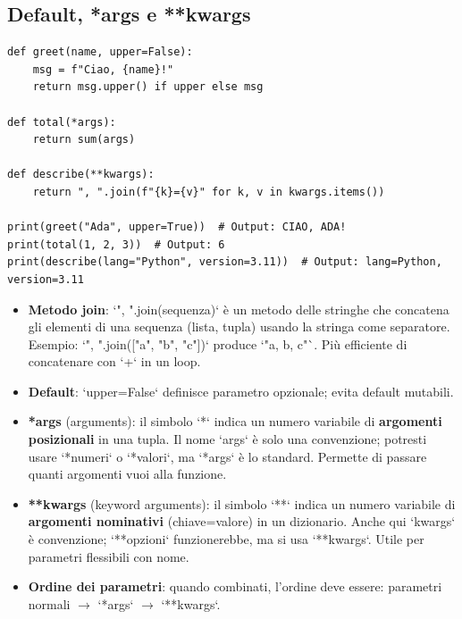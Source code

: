 \subsection{Default, *args e **kwargs}
\label{subsec:fun-args-kwargs}
\begin{lstlisting}
def greet(name, upper=False):
    msg = f"Ciao, {name}!"
    return msg.upper() if upper else msg

def total(*args):
    return sum(args)

def describe(**kwargs):
    return ", ".join(f"{k}={v}" for k, v in kwargs.items())

print(greet("Ada", upper=True))  # Output: CIAO, ADA!
print(total(1, 2, 3))  # Output: 6
print(describe(lang="Python", version=3.11))  # Output: lang=Python, version=3.11
\end{lstlisting}
\begin{tcolorbox}[title=Spiegazione del codice]
\begin{itemize}
  \item \textbf{Metodo join}: `", ".join(sequenza)` è un metodo delle stringhe che concatena gli elementi di una sequenza (lista, tupla) usando la stringa come separatore. Esempio: `", ".join(["a", "b", "c"])` produce `"a, b, c"`. Più efficiente di concatenare con `+` in un loop.
  \item \textbf{Default}: `upper=False` definisce parametro opzionale; evita default mutabili.
  \item \textbf{*args} (arguments): il simbolo `*` indica un numero variabile di \textbf{argomenti posizionali} in una tupla. Il nome `args` è solo una convenzione; potresti usare `*numeri` o `*valori`, ma `*args` è lo standard. Permette di passare quanti argomenti vuoi alla funzione.
  \item \textbf{**kwargs} (keyword arguments): il simbolo `**` indica un numero variabile di \textbf{argomenti nominativi} (chiave=valore) in un dizionario. Anche qui `kwargs` è convenzione; `**opzioni` funzionerebbe, ma si usa `**kwargs`. Utile per parametri flessibili con nome.
  \item \textbf{Ordine dei parametri}: quando combinati, l'ordine deve essere: parametri normali $\rightarrow$ `*args` $\rightarrow$ `**kwargs`.
\end{itemize}
\end{tcolorbox}

